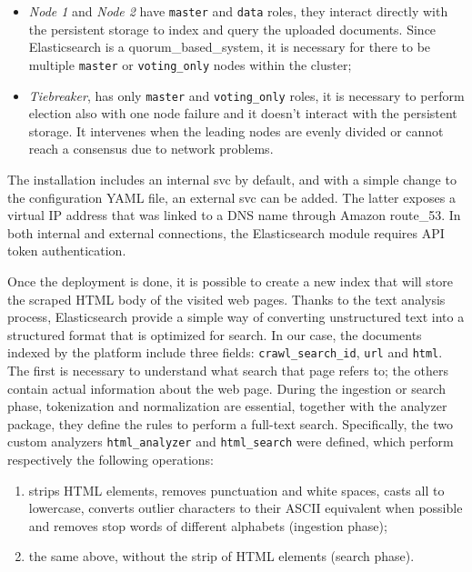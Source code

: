 \documentclass[../thesis.tex]{subfiles}
\begin{document}
\begin{itemize}
    \item \textit{Node 1} and \textit{Node 2} have \texttt{master} and \texttt{data} roles, they interact directly with the persistent storage to index and query the uploaded documents. Since Elasticsearch is a \gls{quorum_based_system}, it is necessary for there to be multiple \texttt{master} or \texttt{voting\_only} nodes within the cluster;
    \item \textit{Tiebreaker}, has only \texttt{master} and \texttt{voting\_only} roles, it is necessary to perform election also with one node failure and it doesn't interact with the persistent storage. It intervenes when the leading nodes are evenly divided or cannot reach a consensus due to network problems.
\end{itemize}

The installation includes an internal \gls{svc} by default, and with a simple change to the configuration \acrshort{YAML} file, an external \gls{svc} can be added. The latter exposes a virtual \acrshort{IP} address that was linked to a \acrshort{DNS} name through Amazon \gls{route_53}. In both internal and external connections, the Elasticsearch module requires \acrshort{API} token authentication.

Once the deployment is done, it is possible to create a new index that will store the scraped \acrshort{HTML} body of the visited web pages. Thanks to the text analysis process, Elasticsearch provide a simple way of converting unstructured text into a structured format that is optimized for search. In our case, the documents indexed by the platform include three fields: \texttt{crawl\_search\_id}, \texttt{url} and \texttt{html}. The first is necessary to understand what search that page refers to; the others contain actual information about the web page. During the ingestion or search phase, tokenization and normalization are essential, together with the analyzer package, they define the rules to perform a full-text search. Specifically, the two custom analyzers \texttt{html\_analyzer} and \texttt{html\_search} were defined, which perform respectively the following operations:

\begin{enumerate}
    \item strips \acrshort{HTML} elements, removes punctuation and white spaces, casts all to lowercase, converts outlier characters to their \acrshort{ASCII} equivalent when possible and removes stop words of different alphabets (ingestion phase);
    \item the same above, without the strip of \acrshort{HTML} elements (search phase).
\end{enumerate}
\end{document}
